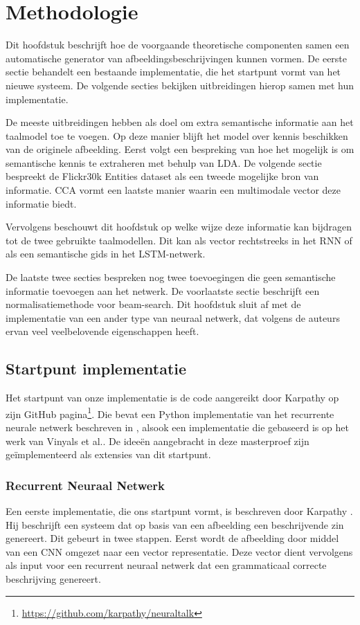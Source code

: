 \chapter{Methodologie}

Dit hoofdstuk beschrijft hoe de voorgaande theoretische componenten samen een automatische generator van afbeeldingsbeschrijvingen kunnen vormen. De eerste sectie behandelt een bestaande implementatie, die het startpunt vormt van het nieuwe systeem. De volgende secties bekijken uitbreidingen hierop samen met hun implementatie. 

De meeste uitbreidingen hebben als doel om extra semantische informatie aan het taalmodel toe te voegen. Op deze manier blijft het model over kennis beschikken van de originele afbeelding. Eerst volgt een bespreking van hoe het mogelijk is om semantische kennis te extraheren met behulp van LDA. De volgende sectie bespreekt de Flickr30k Entities dataset als een tweede mogelijke bron van informatie. CCA vormt een laatste manier waarin een multimodale vector deze informatie biedt.

Vervolgens beschouwt dit hoofdstuk op welke wijze deze informatie kan bijdragen tot de twee gebruikte taalmodellen. Dit kan als vector rechtstreeks in het RNN of als een semantische gids in het LSTM-netwerk. 

De laatste twee secties bespreken nog twee toevoegingen die geen semantische informatie toevoegen aan het netwerk. De voorlaatste sectie beschrijft een normalisatiemethode voor beam-search. Dit hoofdstuk sluit af met de implementatie van een ander type van neuraal netwerk, dat volgens de auteurs ervan veel veelbelovende eigenschappen heeft.


\section{Startpunt implementatie} 
Het startpunt van onze implementatie is de code aangereikt door Karpathy op zijn GitHub pagina\footnote{\url{https://github.com/karpathy/neuraltalk}}. Die bevat een Python implementatie van het recurrente neurale netwerk beschreven in \cite{Karpathy2015}, alsook een implementatie die gebaseerd is op het werk van Vinyals et al.\cite{Google}. De idee\"en aangebracht in deze masterproef zijn ge\"implementeerd als extensies van dit startpunt.

\subsection{Recurrent Neuraal Netwerk}
Een eerste implementatie, die ons startpunt vormt, is beschreven door Karpathy \cite{Karpathy2015}. Hij beschrijft een systeem dat op basis van een afbeelding een beschrijvende zin genereert. Dit gebeurt in twee stappen. Eerst wordt de afbeelding door middel van een CNN omgezet naar een vector representatie. Deze vector dient vervolgens als input voor een recurrent neuraal netwerk dat een grammaticaal correcte beschrijving genereert.

